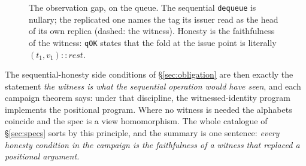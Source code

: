 \documentclass[11pt]{article}
\newcommand{\code}[1]{\texttt{#1}}
\newcommand{\deq}{\mathsf{deq}}
\begin{document}
\begin{figure}[h]
\centering
{}
\caption{The observation gap, on the queue. The sequential
\code{dequeue} is nullary; the replicated one names the tag its issuer
read as the head of its own replica (dashed: the witness). Honesty is
the faithfulness of the witness: \code{qOK} states that the fold at
the issue point is literally $(t_1, v_1) :: \mathit{rest}$.}
\label{fig:witness-queue}
\end{figure}

The sequential-honesty side conditions of \S\ref{sec:obligation} are
then exactly the statement \emph{the witness is what the sequential
operation would have seen}, and each campaign theorem says: under that
discipline, the witnessed-identity program implements the positional
program. Where no witness is needed the alphabets coincide and the
spec is a view homomorphism. The whole catalogue of
\S\ref{sec:specs} sorts by this principle, and the summary is one
sentence: \emph{every honesty condition in the campaign is the
faithfulness of a witness that replaced a positional argument.}
\end{document}
